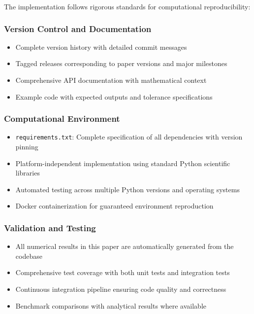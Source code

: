 The implementation follows rigorous standards for computational reproducibility:

\subsubsection{Version Control and Documentation}

\begin{itemize}
\item Complete version history with detailed commit messages
\item Tagged releases corresponding to paper versions and major milestones
\item Comprehensive API documentation with mathematical context
\item Example code with expected outputs and tolerance specifications
\end{itemize}

\subsubsection{Computational Environment}

\begin{itemize}
\item \texttt{requirements.txt}: Complete specification of all dependencies with version pinning
\item Platform-independent implementation using standard Python scientific libraries
\item Automated testing across multiple Python versions and operating systems
\item Docker containerization for guaranteed environment reproduction
\end{itemize}

\subsubsection{Validation and Testing}

\begin{itemize}
\item All numerical results in this paper are automatically generated from the codebase
\item Comprehensive test coverage with both unit tests and integration tests
\item Continuous integration pipeline ensuring code quality and correctness
\item Benchmark comparisons with analytical results where available
\end{itemize}

